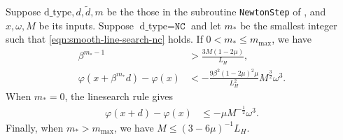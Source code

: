 \begin{lemma}
    \label{lem:newton-cg-nc}%
    Suppose $\text{d\_type}, d, \tilde d, m$ be the those in 
    the subroutine \texttt{NewtonStep} of , and $x, \omega, M$ be its inputs.
    Suppose $\text{d\_type} = \texttt{NC}$ and let 
    $m_*$ be the smallest integer such that \eqref{eqn:smooth-line-search-nc} holds.
    If $0 < m_* \leq m_{\mathrm{max}}$, we have
    \begin{align}
        \label{eqn:newton-cg-nc-stepsize}
        \beta^{m_* - 1} &> \frac{3M(1 - 2\mu)}{L_H}, \\
        \label{eqn:newton-cg-nc-decay}
        \varphi(x + \beta^{m_*}d) - \varphi(x) & <
        -\frac{9\beta^2(1 - 2\mu)^2\mu}{L_H^2} M^{\frac{3}{2}} \omega^3
         .
    \end{align}
    When $m_* = 0$, the linesearch rule gives
    \begin{align}
        \label{eqn:newton-cg-nc-decay-ls0}
        \varphi(x + d) - \varphi(x) &\leq 
        -\mu M^{-\frac{1}{2}} \omega^3
         .
    \end{align}
    Finally, when $m_* > m_{\mathrm{max}}$, we have $M \leq (3 - 6\mu)^{-1} L_H$.
\end{lemma}
